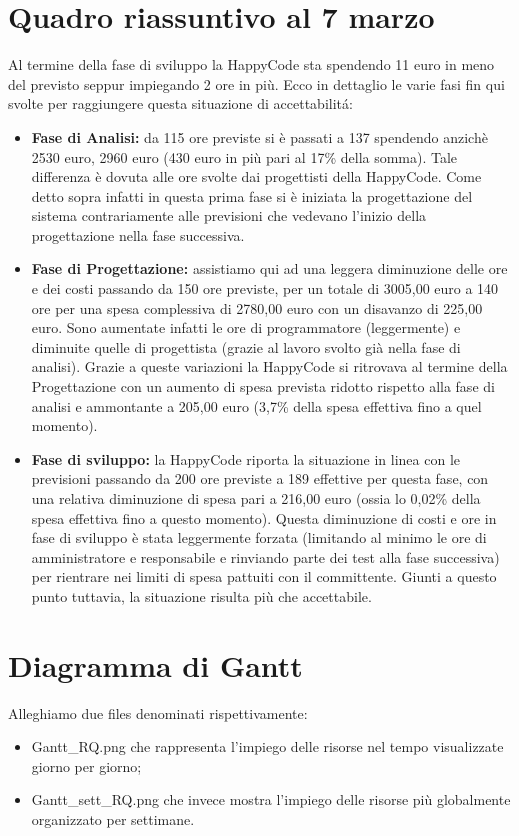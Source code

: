 \chapter{Quadro riassuntivo al 7 marzo}
Al termine della fase di sviluppo la HappyCode sta spendendo 11 euro in meno del previsto seppur impiegando 2 ore in pi\`u. Ecco in dettaglio le varie fasi fin qui svolte per raggiungere questa situazione di accettabilit\'a:
\begin{itemize}
\item \textbf{Fase di Analisi:} da 115 ore previste si \`e passati a 137 spendendo anzich\`e 2530 euro, 2960 euro (430 euro in pi\`u pari al 17\% della somma). Tale differenza \`e dovuta alle ore svolte dai progettisti della HappyCode. Come detto sopra infatti in questa prima fase si \`e iniziata la progettazione del sistema contrariamente alle previsioni che vedevano l'inizio della progettazione nella fase successiva.
\item \textbf{Fase di Progettazione:} assistiamo qui ad una leggera diminuzione delle ore e dei costi passando da 150 ore previste, per un totale di 3005,00 euro a 140 ore per una spesa complessiva di 2780,00 euro con un disavanzo di 225,00 euro. Sono aumentate infatti le ore di programmatore (leggermente) e diminuite quelle di progettista (grazie al lavoro svolto gi\`a nella fase di analisi). Grazie a queste variazioni la HappyCode si ritrovava al termine della Progettazione con un aumento di spesa prevista ridotto rispetto alla fase di analisi e ammontante a 205,00 euro (3,7\% della spesa effettiva fino a quel momento).
\item \textbf{Fase di sviluppo:} la HappyCode riporta la situazione in linea con le previsioni passando da 200 ore previste a 189 effettive per questa fase, con una relativa diminuzione di spesa pari a 216,00 euro (ossia lo 0,02\% della spesa effettiva fino a questo momento). Questa diminuzione di costi e ore in fase di sviluppo \`e stata leggermente forzata (limitando al minimo le ore di amministratore e responsabile e rinviando parte dei test alla fase successiva) per rientrare nei limiti di spesa pattuiti con il committente. Giunti a questo punto tuttavia, la situazione risulta pi\`u che accettabile.

\end{itemize}

\chapter{Diagramma di Gantt}
Alleghiamo due files denominati rispettivamente:
\begin {itemize} 
\item Gantt\_RQ.png che rappresenta l'impiego delle risorse nel tempo visualizzate giorno per giorno;
\item Gantt\_sett\_RQ.png che invece mostra l'impiego delle risorse pi\`u globalmente organizzato per settimane.
\end{itemize}



